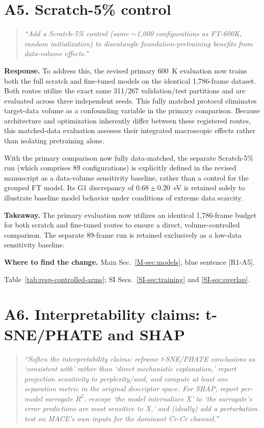 \documentclass[11pt]{article}
\newcommand{\location}[2]{\par{\small\textbf{Where to find the change.} #1\par #2}\par}
\begin{document}
\section*{A5. Scratch-5\% control}

\begin{quote}\small \itshape
``Add a Scratch-5\% control (same $\sim$1,000 configurations as FT-600K, random initialization) to disentangle foundation-pretraining benefits from data-volume effects.''\end{quote}

\textbf{Response.} 
To address this, the revised primary 600~K evaluation now trains both the full scratch and fine-tuned models on the identical 1,786-frame dataset. Both routes utilize the exact same 311/267 validation/test partitions and are evaluated across three independent seeds. This fully matched protocol eliminates target-data volume as a confounding variable in the primary comparison. Because architecture and optimization inherently differ between these registered routes, this matched-data evaluation assesses their integrated macroscopic effects rather than isolating pretraining alone.

With the primary comparison now fully data-matched, the separate Scratch-5\% run (which comprises 89 configurations) is explicitly defined in the revised manuscript as a data-volume sensitivity baseline, rather than a control for the grouped FT model. Its G1 discrepancy of $0.68\pm0.20$~eV is retained solely to illustrate baseline model behavior under conditions of extreme data scarcity.

\textbf{Takeaway.} The primary evaluation now utilizes an identical 1,786-frame budget for both scratch and fine-tuned routes to ensure a direct, volume-controlled comparison. The separate 89-frame run is retained exclusively as a low-data sensitivity baseline.
\location{Main Sec.~\ref{M-sec:models}, blue sentence [R1-A5].}{Table~\ref{tab:resp-controlled-arms}; SI Secs.~\ref{SI-sec:training} and \ref{SI-sec:overlap}.}

\section*{A6. Interpretability claims: t-SNE/PHATE and SHAP}

\begin{quote}\small \itshape
``Soften the interpretability claims: reframe t-SNE/PHATE conclusions as `consistent with' rather than `direct mechanistic explanation,' report projection sensitivity to perplexity/seed, and compute at least one separation metric in the original descriptor space. For SHAP, report per-model surrogate $R^2$, rescope `the model internalizes X' to `the surrogate's error predictions are most sensitive to X,' and (ideally) add a perturbation test on MACE's own inputs for the dominant Cr-Cr channel.''\end{quote}
\end{document}

